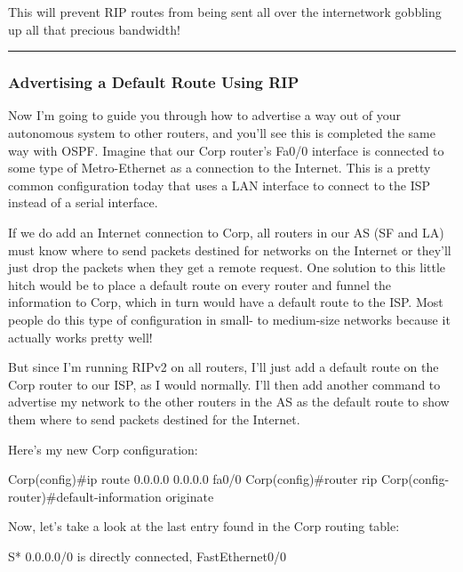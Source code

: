 This will prevent RIP routes from being sent all over the internetwork
gobbling up all that precious bandwidth!

\begin{center}\rule{0.5\linewidth}{0.5pt}\end{center}

\subsubsection{Advertising a Default Route Using RIP}

Now I'm going to guide you through how to advertise a way out of your
autonomous system to other routers, and you'll see this is completed the
same way with OSPF. Imagine that our Corp router's Fa0/0 interface is
connected to some type of Metro-Ethernet as a connection to the
Internet. This is a pretty common configuration today that uses a LAN
interface to connect to the ISP instead of a serial interface.

If we do add an Internet connection to Corp, all routers in our AS (SF
and LA) must know where to send packets destined for networks on the
Internet or they'll just drop the
\protect\hypertarget{c09.xhtmlux5cux23Page_398}{}{}packets when they get
a remote request. One solution to this little hitch would be to place a
default route on every router and funnel the information to Corp, which
in turn would have a default route to the ISP. Most people do this type
of configuration in small- to medium-size networks because it actually
works pretty well!

But since I'm running RIPv2 on all routers, I'll just add a default
route on the Corp router to our ISP, as I would normally. I'll then add
another command to advertise my network to the other routers in the AS
as the default route to show them where to send packets destined for the
Internet.

Here's my new Corp configuration:

\begin{cli}
Corp(config)#ip route 0.0.0.0 0.0.0.0 fa0/0
Corp(config)#router rip
Corp(config-router)#default-information originate
\end{cli}

Now, let's take a look at the last entry found in the Corp routing
table:

\begin{cli}
S*   0.0.0.0/0 is directly connected, FastEthernet0/0
\end{cli}

